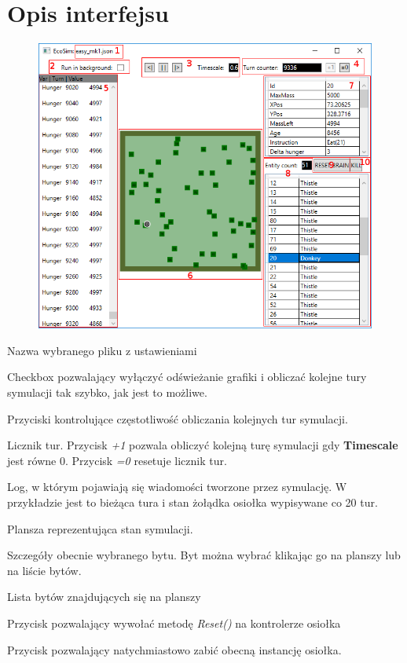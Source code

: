\section{Opis interfejsu}
\begin{figure}[H]
    \centering
    \includegraphics[scale=0.55]{Chapters/interface_annotated}
    \end{figure}
\begin{interface_descs}
    \item Nazwa wybranego pliku z ustawieniami
    \item Checkbox pozwalający wyłączyć odświeżanie grafiki i obliczać kolejne tury symulacji tak szybko, jak jest to możliwe.
    \item Przyciski kontrolujące częstotliwość obliczania kolejnych tur symulacji.
    \item Licznik tur. Przycisk \textit{+1} pozwala obliczyć kolejną turę symulacji gdy \textbf{Timescale} jest równe 0. Przycisk \textit{=0} resetuje licznik tur.
    \item Log, w którym pojawiają się wiadomości tworzone przez symulację. W przykładzie jest to bieżąca tura i stan żołądka osiołka wypisywane co 20 tur.
    \item Plansza reprezentująca stan symulacji.
    \item Szczegóły obecnie wybranego bytu. Byt można wybrać klikając go na planszy lub na liście bytów.
    \item Lista bytów znajdujących się na planszy
    \item Przycisk pozwalający wywołać metodę \textit{Reset()} na kontrolerze osiołka
    \item Przycisk pozwalający natychmiastowo zabić obecną instancję osiołka.
\end{interface_descs}

